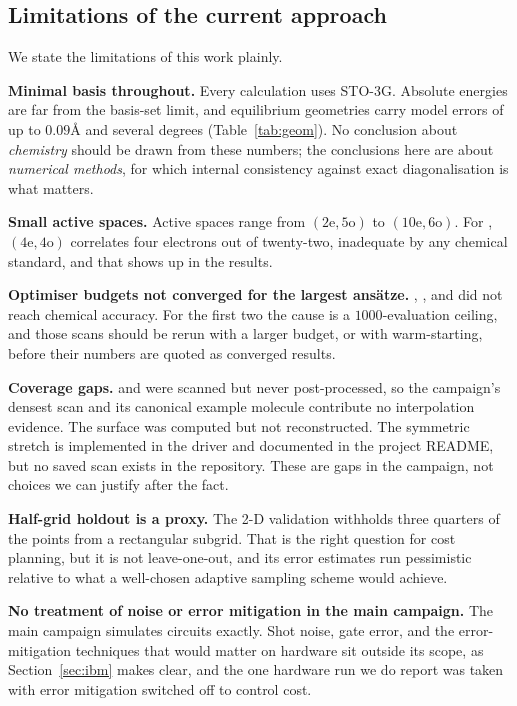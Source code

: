 \documentclass[sigconf,screen,nonacm]{acmart}
\newcommand{\Ang}{\text{\AA}}
\begin{document}
\subsection{Limitations of the current approach}
\label{sec:limitations}
We state the limitations of this work plainly.

\textbf{Minimal basis throughout.} Every calculation uses STO-3G. Absolute
energies are far from the basis-set limit, and equilibrium geometries carry
model errors of up to $0.09\Ang$ and several degrees (Table~\ref{tab:geom}).
No conclusion about \emph{chemistry} should be drawn from these numbers; the
conclusions here are about \emph{numerical methods}, for which internal
consistency against exact diagonalisation is what matters.

\textbf{Small active spaces.} Active spaces range from $(2\text{e},5\text{o})$
to $(10\text{e},6\text{o})$. For , $(4\text{e},4\text{o})$ correlates
four electrons out of twenty-two, inadequate by any chemical standard, and
that shows up in the results.

\textbf{Optimiser budgets not converged for the largest ans\"atze.}
, ,  and  did not reach chemical accuracy. For
the first two the cause is a $1000$-evaluation ceiling, and those scans
should be rerun with a larger budget, or with warm-starting, before their
numbers are quoted as converged results.

\textbf{Coverage gaps.}  and  were scanned but never
post-processed, so the campaign's densest scan and its canonical example
molecule contribute no interpolation evidence. The  surface was
computed but not reconstructed. The  symmetric stretch is implemented
in the driver and documented in the project README, but no saved scan exists
in the repository. These are gaps in the campaign, not choices we can justify
after the fact.

\textbf{Half-grid holdout is a proxy.} The 2-D validation withholds three
quarters of the points from a rectangular subgrid. That is the right question
for cost planning, but it is not leave-one-out, and its error estimates run
pessimistic relative to what a well-chosen adaptive sampling scheme would
achieve.

\textbf{No treatment of noise or error mitigation in the main campaign.} The
main campaign simulates circuits exactly. Shot noise, gate error, and the
error-mitigation techniques that would matter on hardware sit outside its
scope, as Section~\ref{sec:ibm} makes clear, and the one hardware run we do
report was taken with error mitigation switched off to control cost.
\end{document}
